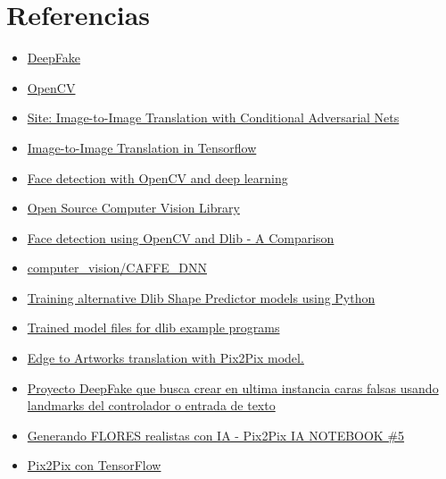 \documentclass[10pt,journal,compsoc]{IEEEtran}\usepackage[T1]{fontenc}                              %
\begin{document}
\section{Referencias}
\begin{itemize}
\item
  \href{https://en.wikipedia.org/wiki/Deepfake}{DeepFake}
\item
  \href{https://es.wikipedia.org/wiki/OpenCV}{OpenCV}
\item
  \href{https://phillipi.github.io/pix2pix/}{Site: Image-to-Image
  Translation with Conditional Adversarial Nets}
\item
  \href{https://affinelayer.com/pix2pix/}{Image-to-Image Translation in
  Tensorflow}
\item
  \href{https://www.pyimagesearch.com/2018/02/26/face-detection-with-opencv-and-deep-learning/\#post_downloads}{Face
  detection with OpenCV and deep learning}
\item
  \href{https://github.com/opencv/opencv/tree/master/samples/dnn/face_detector}{Open
  Source Computer Vision Library}
\item
  \href{https://github.com/arunponnusamy/face-detection-comparison}{Face
  detection using OpenCV and Dlib - A Comparison}
\item
  \href{https://github.com/thegopieffect/computer_vision/tree/master/CAFFE_DNN}{computer\_vision/CAFFE\_DNN}
\item
  \href{https://medium.com/datadriveninvestor/training-alternative-dlib-shape-predictor-models-using-python-d1d8f8bd9f5c}{Training
  alternative Dlib Shape Predictor models using Python}
\item
  \href{https://github.com/davisking/dlib-models}{Trained model files
  for dlib example programs}
\item
  \href{https://github.com/gallardorafael/edge2art}{Edge to Artworks
  translation with Pix2Pix model.}
\item
  \href{https://github.com/RonyBenitez/mimix}{Proyecto DeepFake que
  busca crear en ultima instancia caras falsas usando landmarks del
  controlador o entrada de texto}
\item
  \href{https://www.youtube.com/watch?v=YsrMGcgfETY}{Generando FLORES
  realistas con IA - Pix2Pix \textbar{} IA NOTEBOOK \#5}
\item
  \href{https://www.tensorflow.org/tutorials/generative/pix2pix}{Pix2Pix
  con TensorFlow}
\end{itemize}

\end{document}

